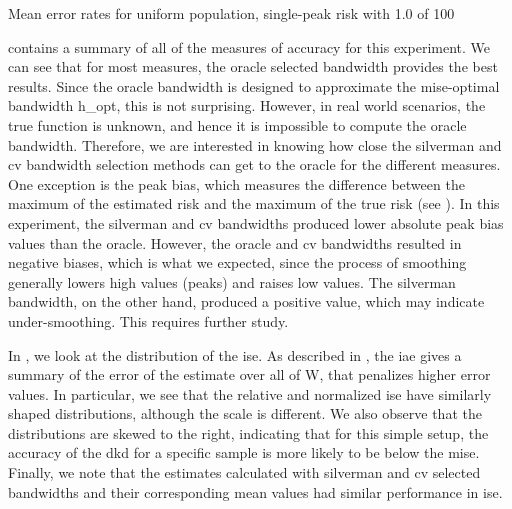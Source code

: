 \begin{table}[htbp]
    \centering
    
    \caption{Mean error rates for uniform population, single-peak risk with  1.0 of  100}
    \label{tab:errors:unif_100_1.0_1h}
\end{table}

 contains a summary of all of the measures of accuracy for this experiment.
We can see that for most measures, the \gls{oracle} selected bandwidth provides the best results.
Since the \gls{oracle} bandwidth is designed to approximate the \gls{mise}-optimal bandwidth \gls{h_opt},
this is not surprising.
However, in real world scenarios, the true function is unknown, and hence it is impossible to compute the \gls{oracle} bandwidth.
Therefore, we are interested in knowing how close the \gls{silverman} and \gls{cv} bandwidth selection methods can get to the \gls{oracle} for the different measures.
One exception is the \gls{peak bias}, which measures the difference between the maximum of the estimated risk and the maximum of the true risk (see ).
In this experiment, the \gls{silverman} and \gls{cv} bandwidths produced lower absolute \gls{peak bias} values than the \gls{oracle}. 
However, the \gls{oracle} and \gls{cv} bandwidths resulted in negative biases,
which is what we expected,
since the process of smoothing generally lowers high values (peaks) and raises low values.
The \gls{silverman} bandwidth, on the other hand, produced a positive value,
which may indicate under-smoothing.
This requires further study.

In , we look at the distribution of the \gls{ise}.
As described in ,
the \gls{iae} gives a summary of the error of the estimate over all of \gls{W},
that penalizes higher error values.
In particular, we see that the relative and normalized \gls{ise} have similarly shaped distributions, although the scale is different.
We also observe that the distributions are skewed to the right,
indicating that for this simple setup,
the accuracy of the \gls{dkd} for a specific sample is more likely to be below the \gls{mise}.
Finally, we note that the estimates calculated with \gls{silverman} and \gls{cv}
selected bandwidths and their corresponding mean values had similar performance in \gls{ise}.

